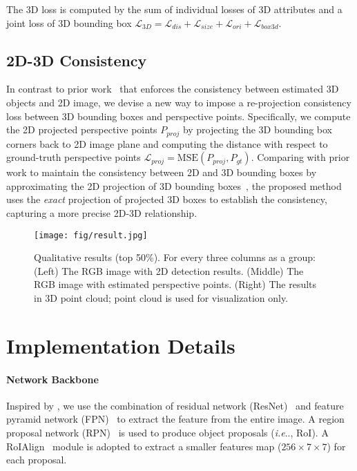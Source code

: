 \documentclass{article}
\makeatletter
\DeclareRobustCommand\onedot{\futurelet\@let@token\@onedot}
\def\@onedot{\ifx\@let@token.\else.\null\fi\xspace}
\def\ie{\emph{i.e}\onedot} \def\Ie{\emph{I.e}\onedot}
\makeatother
\begin{document}
The 3D loss is computed by the sum of individual losses of 3D attributes and a joint loss of 3D bounding box $\mathcal{L}_{3D} = \mathcal{L}_{dis} + \mathcal{L}_{size} + \mathcal{L}_{ori} + \mathcal{L}_{box3d}$.


\subsection{2D-3D Consistency}
\label{sec:consistency}

In contrast to prior work~\cite{wu2016single,rezende2016unsupervised,yan2016perspective,mousavian20173d,wu2017marrnet,huang2018cooperative} that enforces the consistency between estimated 3D objects and 2D image, we devise a new way to impose a re-projection consistency loss between 3D bounding boxes and perspective points. Specifically, we compute the 2D projected perspective points $P_{proj}$ by projecting the 3D bounding box corners back to 2D image plane and computing the distance with respect to ground-truth perspective points $\mathcal{L}_{proj} = \text{MSE} (P_{proj}, P_{gt})$. Comparing with prior work to maintain the consistency between 2D and 3D bounding boxes by approximating the 2D projection of 3D bounding boxes~\cite{mousavian20173d,huang2018cooperative}, the proposed method uses the \emph{exact} projection of projected 3D boxes to establish the consistency, capturing a more precise 2D-3D relationship.

\begin{figure}[t!]
    \begin{center}
        \texttt{[image: fig/result.jpg]}
    \end{center}
    \vspace{-6pt}
    \caption{Qualitative results (top 50\%). For every three columns as a group: (Left) The RGB image with 2D detection results. (Middle) The RGB image with estimated perspective points. (Right) The results in 3D point cloud; point cloud is used for visualization only.}
    \label{fig:result}
    \vspace{6pt}
\end{figure}

\section{Implementation Details}
\label{sec:details}

\paragraph{Network Backbone} Inspired by \citet{he2017mask}, we use the combination of residual network (ResNet)~\cite{he2016deep} and feature pyramid network (FPN)~\cite{lin2017feature} to extract the feature from the entire image. A region proposal network (RPN)~\cite{ren2015faster} is used to produce object proposals (\ie, RoI). A RoIAlign~\cite{he2017mask} module is adopted to extract a smaller features map ($256 \times 7\times7$) for each proposal.
\end{document}
